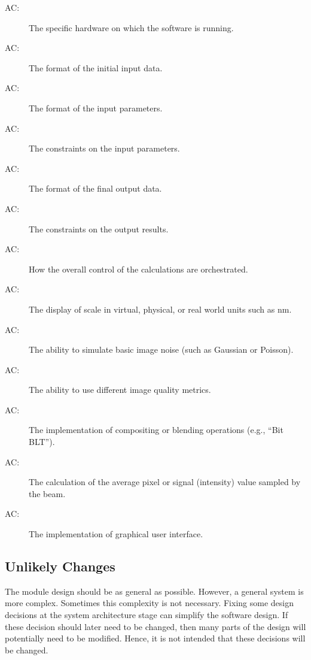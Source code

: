 \documentclass[12pt, titlepage]{article}
\newcounter{acnum}
\newcommand{\actheacnum}{AC\theacnum}
\begin{document}
\begin{description}
  \item[ \actheacnum \label{AC_hardware}:] The specific
    hardware on which the software is running.
  \item[ \actheacnum \label{AC_input}:] The format of the
    initial input data.
  \item[ \actheacnum \label{AC_inFormat}:] The format of the input parameters.
  \item[ \actheacnum \label{AC_inVerif}:] The constraints on the input parameters.
  \item[ \actheacnum \label{AC_outFormat}:] The format of the final output data.
  \item[ \actheacnum \label{AC_outVerif}:] The constraints on the output results.
  \item[ \actheacnum \label{AC_calc}:] How the overall control of the
    calculations are orchestrated.
  \item[ \actheacnum \label{AC_displayUnits}:] The display of scale in
    virtual, physical, or real world units such as \si{nm}.
  \item[ \actheacnum \label{AC_simNoise}:] The ability to simulate basic
    image noise (such as Gaussian or Poisson).
  \item[ \actheacnum \label{AC_imgMetricAlgos}:] The ability
    to use different image quality metrics.
  \item[ \actheacnum \label{AC_maskOpts}:] The implementation of compositing
    or blending operations (e.g., ``Bit BLT'').
  \item[ \actheacnum \label{AC_calcSignal}:] The calculation of the
    average pixel or signal (intensity) value sampled by the beam.
  \item[ \actheacnum \label{AC_GUI}:] The implementation of graphical user
    interface.
\end{description}

\subsection{Unlikely Changes} \label{SecUchange}

The module design should be as general as possible. However, a general system is
more complex. Sometimes this complexity is not necessary. Fixing some design
decisions at the system architecture stage can simplify the software design. If
these decision should later need to be changed, then many parts of the design
will potentially need to be modified. Hence, it is not intended that these
decisions will be changed.
\end{document}
